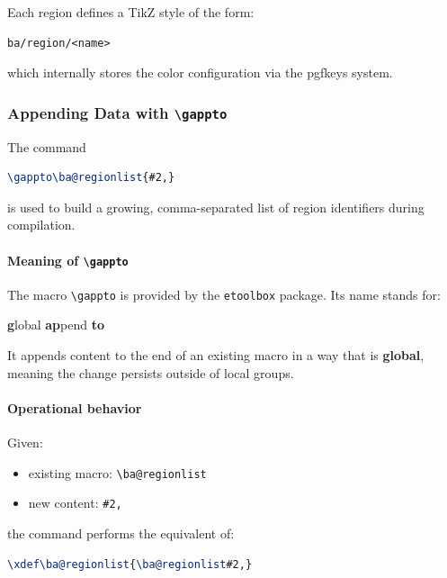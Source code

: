 Each region defines a TikZ style of the form:

\begin{lstlisting}[language=LaTeX]
ba/region/<name>
\end{lstlisting}

which internally stores the color configuration via the pgfkeys system.

\subsubsection{Appending Data with \texttt{\textbackslash gappto}}

The command

\begin{lstlisting}[language=LaTeX]
\gappto\ba@regionlist{#2,}
\end{lstlisting}

is used to build a growing, comma-separated list of region identifiers during compilation.

\paragraph{Meaning of \texttt{\textbackslash gappto}}

The macro \verb|\gappto| is provided by the \texttt{etoolbox} package. Its name stands for:

\begin{center}
\textbf{g}lobal \textbf{ap}pend \textbf{to}
\end{center}

It appends content to the end of an existing macro in a way that is \textbf{global}, meaning the change persists outside of local groups.



\paragraph{Operational behavior}

Given:

\begin{itemize}
\item existing macro: \verb|\ba@regionlist|
\item new content: \verb|#2,|
\end{itemize}

the command performs the equivalent of:

\begin{lstlisting}[language=LaTeX]
\xdef\ba@regionlist{\ba@regionlist#2,}
\end{lstlisting}


